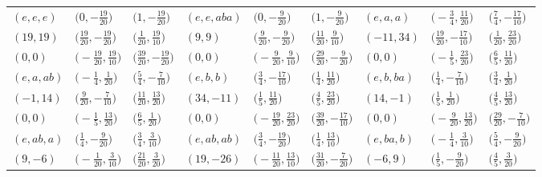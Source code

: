 \documentclass[pdftex]{sigma}
\theoremstyle{definition}
\numberwithin{equation}{section}
\begin{document}
\begin{landscape}
\begin{table}[th]\centering\small
\begin{tabular}{|lll|lll|lll|}
 \hline
 $(e, e, e)$ & $\bigl(0, -\frac{19}{20}\bigr)$ & $\bigl(1, -\frac{19}{20}\bigr)$ & $(e, e,aba)$ & $\bigl(0, -\frac{9}{20}\bigr)$ & $\bigl(1, -\frac{9}{20}\bigr)$ & $(e, a, a)$ & $\bigl(-\frac{3}{4}, \frac{11}{20}\bigr)$ & $\bigl(\frac{7}{4}, -\frac{17}{10}\bigr)$
 \\
$(19, 19)$ & $\bigl(\frac{19}{20}, -\frac{19}{20}\bigr)$ & $\bigl(\frac{1}{20}, \frac{19}{10}\bigr)$ & $(9, 9)$ & $\bigl(\frac{9}{20}, -\frac{9}{20}\bigr)$ & $\bigl(\frac{11}{20}, \frac{9}{10}\bigr)$ & $(-11, 34)$ & $\bigl(\frac{19}{20}, -\frac{17}{10}\bigr)$ & $\bigl(\frac{1}{20}, \frac{23}{20}\bigr)$
\\
$(0, 0)$ & $\bigl(-\frac{19}{20}, \frac{19}{10}\bigr)$ & $\bigl(\frac{39}{20}, -\frac{19}{20}\bigr)$ & $(0, 0)$ & $\bigl(-\frac{9}{20}, \frac{9}{10}\bigr)$ & $\bigl(\frac{29}{20}, -\frac{9}{20}\bigr)$ & $(0, 0)$ & $\bigl(-\frac{1}{5}, \frac{23}{20}\bigr)$ & $\bigl(\frac{6}{5}, \frac{11}{20}\bigr)$
\\\hline
$(e, a, ab)$ & $\bigl(-\frac{1}{4}, \frac{1}{20}\bigr)$ & $\bigl(\frac{5}{4}, -\frac{7}{10}\bigr)$ & $(e, b, b)$ & $\bigl(\frac{3}{4}, -\frac{17}{10}\bigr)$ & $\bigl(\frac{1}{4}, \frac{11}{20}\bigr)$ & $(e, b, ba)$ & $\bigl(\frac{1}{4}, -\frac{7}{10}\bigr)$ & $\bigl(\frac{3}{4}, \frac{1}{20}\bigr)$
\\
$(-1, 14)$ & $\bigl(\frac{9}{20}, -\frac{7}{10}\bigr)$ & $\bigl(\frac{11}{20}, \frac{13}{20}\bigr)$ & $(34, -11)$ & $\bigl(\frac{1}{5}, \frac{11}{20}\bigr)$ & $\bigl(\frac{4}{5}, \frac{23}{20}\bigr)$ & $(14, -1)$ & $\bigl(\frac{1}{5}, \frac{1}{20}\bigr)$ & $\bigl(\frac{4}{5}, \frac{13}{20}\bigr)$
\\
$(0, 0)$ & $\bigl(-\frac{1}{5}, \frac{13}{20}\bigr)$ & $\bigl(\frac{6}{5}, \frac{1}{20}\bigr)$ & $(0, 0)$ & $\bigl(-\frac{19}{20}, \frac{23}{20}\bigr)$ & $\bigl(\frac{39}{20}, -\frac{17}{10}\bigr)$ & $(0, 0)$ & $\bigl(-\frac{9}{20}, \frac{13}{20}\bigr)$ & $\bigl(\frac{29}{20}, -\frac{7}{10}\bigr)$
\\\hline
$(e, ab, a)$ & $\bigl(\frac{1}{4}, -\frac{9}{20}\bigr)$ & $\bigl(\frac{3}{4}, \frac{3}{10}\bigr)$ & $(e, ab, ab)$ & $\bigl(\frac{3}{4}, -\frac{19}{20}\bigr)$ & $\bigl(\frac{1}{4}, \frac{13}{10}\bigr)$ & $(e, ba, b)$ & $\bigl(-\frac{1}{4}, \frac{3}{10}\bigr)$ & $\bigl(\frac{5}{4}, -\frac{9}{20}\bigr)$
\\
$(9, -6)$ & $\bigl(-\frac{1}{20}, \frac{3}{10}\bigr)$ & $\bigl(\frac{21}{20}, \frac{3}{20}\bigr)$ & $(19, -26)$ & $\bigl(-\frac{11}{20}, \frac{13}{10}\bigr)$ & $\bigl(\frac{31}{20}, -\frac{7}{20}\bigr)$ & $(-6, 9)$ & $\bigl(\frac{1}{5}, -\frac{9}{20}\bigr)$ & $\bigl(\frac{4}{5}, \frac{3}{20}\bigr)$

\end{tabular}
\end{table}
\end{landscape}
\end{document}
